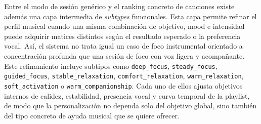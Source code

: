 Entre el modo de sesión genérico y el ranking concreto de canciones existe
además una capa intermedia de \textit{subtypes} funcionales. Esta capa permite
refinar el perfil musical cuando una misma combinación de objetivo, mood e
intensidad puede adquirir matices distintos según el resultado esperado o la
preferencia vocal. Así, el sistema no trata igual un caso de foco instrumental
orientado a concentración profunda que una sesión de foco con voz ligera y
acompañante. Este refinamiento incluye subtipos como
\texttt{deep\_focus}, \texttt{steady\_focus}, \texttt{guided\_focus},
\texttt{stable\_relaxation}, \texttt{comfort\_relaxation},
\texttt{warm\_relaxation}, \texttt{soft\_activation} o
\texttt{warm\_companionship}. Cada uno de ellos ajusta objetivos internos de
calidez, estabilidad, presencia vocal y curva temporal de la playlist, de modo
que la personalización no dependa solo del objetivo global, sino también del
tipo concreto de ayuda musical que se quiere ofrecer.

